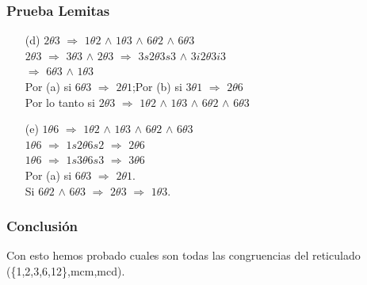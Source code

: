 \documentclass{beamer}
\begin{document}
\begin{frame}
\frametitle{Prueba Lemitas}
\begin{enumerate}
\item[(d)] $2\theta 3$ $\Rightarrow$ $1\theta 2$ $\wedge$ $1\theta 3$ $\wedge$ $6\theta 2$
       $\wedge$ $6\theta 3$\\
       $2\theta 3$ $\Rightarrow$ $3\theta 3$ $\wedge$ $2\theta 3$ $\Rightarrow$
       $3s2\theta 3s3$ $\wedge$ $3i2\theta 3i3$\\ 
       $\Rightarrow$ $6\theta 3$ $\wedge$ $1\theta 3$\\
       Por (a) si $6\theta 3$ $\Rightarrow$ $2\theta 1$;Por (b) si $3\theta 1$
       $\Rightarrow$ $2\theta 6$\\
       Por lo tanto si $2\theta 3$ $\Rightarrow$ $1\theta 2$ $\wedge$ $1\theta 3$ $\wedge$ $6\theta 2$
       $\wedge$ $6\theta 3$\\

\item[(e)] $1\theta 6$ $\Rightarrow$ $1\theta 2$ $\wedge$ $1\theta 3$ $\wedge$ $6\theta 2$
       $\wedge$ $6\theta 3$\\
       $1\theta 6$ $\Rightarrow$ $1s2\theta 6s2$ $\Rightarrow$ $2\theta 6$\\
       $1\theta 6$ $\Rightarrow$ $1s3\theta 6s3$ $\Rightarrow$ $3\theta 6$\\
       Por (a) si $6\theta 3$ $\Rightarrow$ $2\theta 1$.\\
       Si $6\theta 2$ $\wedge$ $6\theta 3$ $\Rightarrow$ $2\theta 3$
       $\Rightarrow$ $1\theta 3$.
\end{enumerate}
\end{frame}

\begin{frame}
\frametitle{Conclusi\'on}
Con esto hemos probado cuales son todas las congruencias del reticulado (\{1,2,3,6,12\},mcm,mcd). 
\end{frame}
\end{document}
